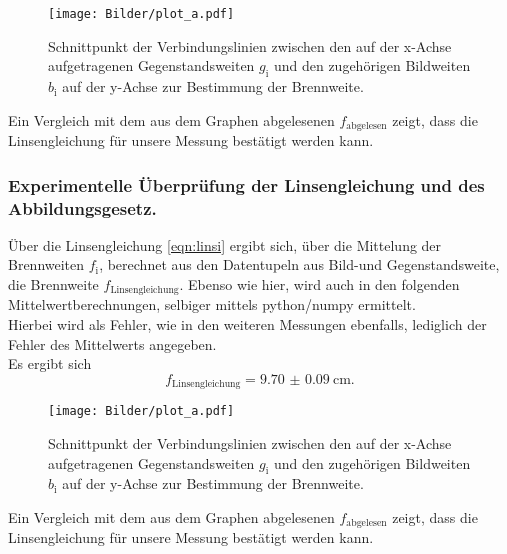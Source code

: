 \begin{figure}
  \centering
  \texttt{[image: Bilder/plot\_a.pdf]}
  \caption{Schnittpunkt der Verbindungslinien zwischen den auf der x-Achse aufgetragenen Gegenstandsweiten $g_\mathrm{i}$ und den zugehörigen Bildweiten $b_\mathrm{i}$ auf der y-Achse zur Bestimmung der Brennweite.}
  \label{fig:plota}
\end{figure}
Ein Vergleich mit dem aus dem Graphen abgelesenen $f_{\mathrm{abgelesen}}$ zeigt, dass die Linsengleichung für unsere Messung bestätigt werden kann.

\subsubsection{Experimentelle Überprüfung der Linsengleichung und des Abbildungsgesetz.}
Über die Linsengleichung \eqref{eqn:linsi} ergibt sich, über die Mittelung der Brennweiten $f_{\mathrm{i}}$, berechnet aus den Datentupeln aus Bild-und Gegenstandsweite, die Brennweite $f_{\mathrm{Linsengleichung}}$.
Ebenso wie hier, wird auch in den folgenden Mittelwertberechnungen, selbiger mittels python/numpy \cite{numpy} ermittelt.\\
Hierbei wird als Fehler, wie in den weiteren Messungen ebenfalls, lediglich der Fehler des Mittelwerts angegeben.\\
Es ergibt sich
\begin{equation}
  f_{\mathrm{Linsengleichung}}=\SI{9.70(9)}{\centi\meter}\text{.}
\end{equation}

\begin{figure}
  \centering
  \texttt{[image: Bilder/plot\_a.pdf]}
  \caption{Schnittpunkt der Verbindungslinien zwischen den auf der x-Achse aufgetragenen Gegenstandsweiten $g_\mathrm{i}$ und den zugehörigen Bildweiten $b_\mathrm{i}$ auf der y-Achse zur Bestimmung der Brennweite.}
  \label{fig:plota}
\end{figure}
Ein Vergleich mit dem aus dem Graphen abgelesenen $f_{\mathrm{abgelesen}}$ zeigt, dass die Linsengleichung für unsere Messung bestätigt werden kann.


